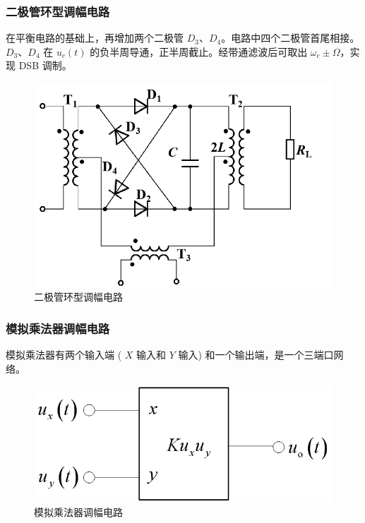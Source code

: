 \subsubsection{二极管环型调幅电路}

在平衡电路的基础上，再增加两个二极管 $D_3$、$D_4$。电路中四个二极管首尾相接。$D_3$、$D_4$ 在 $u_c(t)$ 的负半周导通，正半周截止。经带通滤波后可取出 $\omega_c \pm \Omega$，实现 DSB 调制。

\begin{figure}[htbp]
    \centering
    \includegraphics[scale=0.6]{image/Picture13.png}
    \caption{二极管环型调幅电路}
\end{figure}

\subsubsection{模拟乘法器调幅电路}

模拟乘法器有两个输入端 ( $X$ 输入和 $Y$ 输入) 和一个输出端，是一个三端口网络。

\begin{figure}[htbp]
    \centering
    \includegraphics[scale=0.4]{image/Picture14.png}
    \caption{模拟乘法器调幅电路}
\end{figure}

